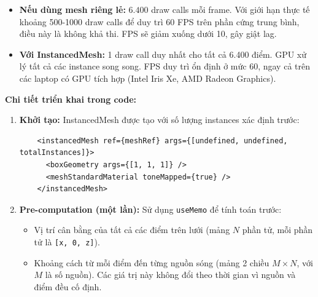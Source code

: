 \begin{itemize}
    \item \textbf{Nếu dùng mesh riêng lẻ:} $6.400$ draw calls mỗi frame. Với giới hạn thực tế khoảng 500-1000 draw calls để duy trì 60 FPS trên phần cứng trung bình, điều này là không khả thi. FPS sẽ giảm xuống dưới 10, gây giật lag.
    
    \item \textbf{Với InstancedMesh:} 1 draw call duy nhất cho tất cả 6.400 điểm. GPU xử lý tất cả các instance song song. FPS duy trì ổn định ở mức 60, ngay cả trên các laptop có GPU tích hợp (Intel Iris Xe, AMD Radeon Graphics).
\end{itemize}

\textbf{Chi tiết triển khai trong code:}

\begin{enumerate}
    \item \textbf{Khởi tạo:} InstancedMesh được tạo với số lượng instances xác định trước:
    \begin{verbatim}
    <instancedMesh ref={meshRef} args={[undefined, undefined, totalInstances]}>
      <boxGeometry args={[1, 1, 1]} />
      <meshStandardMaterial toneMapped={true} />
    </instancedMesh>
    \end{verbatim}

    \item \textbf{Pre-computation (một lần):} Sử dụng \texttt{useMemo} để tính toán trước:
    \begin{itemize}
        \item Vị trí cân bằng của tất cả các điểm trên lưới (mảng $N$ phần tử, mỗi phần tử là \texttt{[x, 0, z]}).
        \item Khoảng cách từ mỗi điểm đến từng nguồn sóng (mảng 2 chiều $M \times N$, với $M$ là số nguồn). Các giá trị này không đổi theo thời gian vì nguồn và điểm đều cố định.
    \end{itemize}


\end{enumerate}
